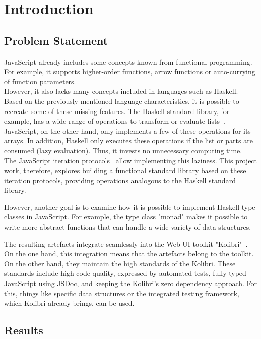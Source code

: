 \chapter{Introduction}
\label{chap:introduction}

\section*{Problem Statement} %
\label{sec:Problem Statement}
JavaScript already includes some concepts known from functional programming.
For example, it supports higher-order functions, arrow functions or
auto-currying of function parameters.\\
However, it also lacks many concepts included in languages such as Haskell. Based on
the previously mentioned language characteristics, it is possible to recreate some of
these missing features. The Haskell standard library, for example, has a wide range of
operations to transform or evaluate lists~\cite{haskell_list}. JavaScript, on the other hand, only
implements a few of these operations for its arrays. In addition, Haskell only
executes these operations if the list or parts are consumed (lazy evaluation).
Thus, it invests no unnecessary computing time.\\
The JavaScript iteration protocols~\cite{mdn_protocols} allow implementing this laziness. This
project work, therefore, explores building a functional standard library based
on these iteration protocols, providing operations analogous to the Haskell
standard library.

However, another goal is to examine how it is possible to implement Haskell
type classes in JavaScript. 
For example, the type class "monad" makes it possible to write more abstract functions that can
handle a wide variety of data structures.

The resulting artefacts integrate seamlessly into the Web UI toolkit
"Kolibri"~\cite{kolibri}. On the one hand, this integration means that the
artefacts belong to the toolkit. On the other hand, they maintain the high
standards of the Kolibri. These standards include high code quality, expressed
by automated tests, fully typed JavaScript using JSDoc, and keeping the
Kolibri's zero dependency approach. For this, things like specific data
structures or the integrated testing framework, which Kolibri already
brings, can be used.

\section*{Results} %
\label{sec:Introduction_Results}

